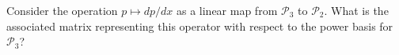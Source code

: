 \documentclass[12pt, leqno]{article}
\begin{document}

Consider the operation $p \mapsto dp/dx$ as a linear map from
$\mathcal{P}_3$ to $\mathcal{P}_2$.  What is the associated matrix
representing this operator with respect to the power basis for
$\mathcal{P}_3$?
\end{document}
